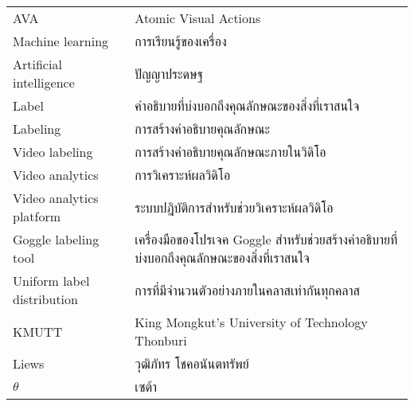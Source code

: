 \begin{abbreviations}
    \noindent
    \begin{tabular*}{\textwidth}{@{}p{}p{}@{}}
        {AVA} & {Atomic Visual Actions} \\
        {Machine learning} & {การเรียนรู้ของเครื่อง} \\
        {Artificial intelligence} & {ปัญญาประดษฐ} \\
        {Label} & {คำอธิบายที่บ่งบอกถึงคุณลักษณะของสิ่งที่เราสนใจ} \\
        {Labeling} & {การสร้างคำอธิบายคุณลักษณะ} \\
        {Video labeling} & {การสร้างคำอธิบายคุณลักษณะภายในวิดิโอ} \\
        {Video analytics} & {การวิเคราะห์ผลวิดิโอ} \\
	{Video analytics platform} & {ระบบปฎิบัติการสำหรับช่วยวิเคราะห์ผลวิดิโอ} \\
        {Goggle labeling tool} & {เครื่องมือของโปรเจค Goggle สำหรับช่วยสร้างคำอธิบายที่บ่งบอกถึงคุณลักษณะของสิ่งที่เราสนใจ} \\
        {Uniform label distribution} & {การที่มีจำนวนตัวอย่างภายในคลาสเท่ากันทุกคลาส} \\
        {KMUTT} & {King Mongkut's University of Technology Thonburi} \\
        {Liews} & {วุฒิภัทร โชคอนันตทรัพย์} \\
        {$\theta$} & {เซต้า}
    \end{tabular*}
\end{abbreviations}
